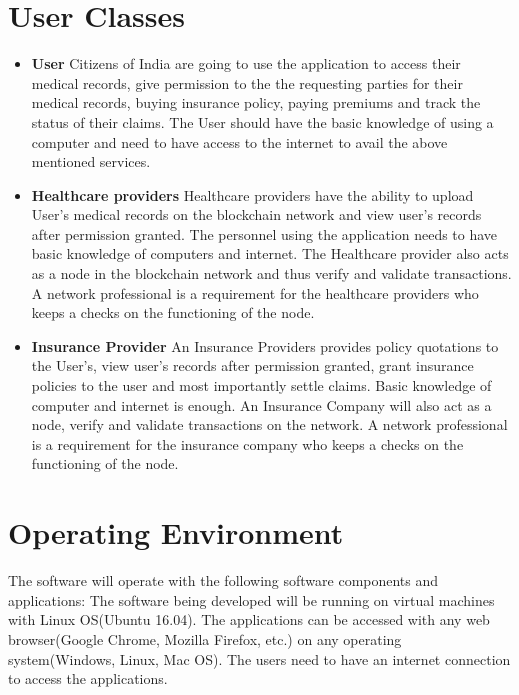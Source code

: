 \section{User Classes}
\begin{itemize}
	\item \textbf{User} \newline Citizens of India are going to use the application to access their medical records, give permission to the the requesting parties for their medical records, buying insurance policy, paying premiums and track the status of their claims. The User should have the basic knowledge of using a computer and need to have access to the internet to avail the above mentioned services.
	      	                  
	\item \textbf{Healthcare providers} \newline Healthcare providers have the ability to upload User’s medical records on the blockchain network and view user’s records after permission granted. The personnel using the application needs to have basic knowledge of computers and internet. The Healthcare provider also acts as a node in the blockchain network and thus verify and validate transactions. A network professional is a requirement for the healthcare providers who keeps a checks on the functioning of the node.
	      	                  
	\item \textbf{Insurance Provider} \newline An Insurance Providers provides policy quotations to the User’s, view user’s records after permission granted, grant insurance policies to the user and most importantly settle claims. Basic knowledge of computer and internet is enough. An Insurance Company will also act as a node, verify and validate transactions on the network. A network professional is a requirement for the insurance company who keeps a checks on the functioning of the node.
	      	      
\end{itemize}
\clearpage
\section{Operating Environment}

The software will operate with the following software components and applications:\newline
The software being developed will be running on virtual machines with Linux OS(Ubuntu 16.04). The applications can be accessed with any web browser(Google Chrome, Mozilla Firefox, etc.) on any operating system(Windows, Linux, Mac OS). The users need to have an internet connection to access the applications.

